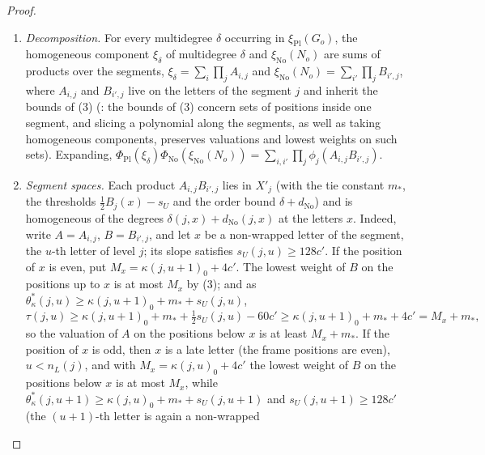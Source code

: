 \begin{proof}
\begin{enumerate}[label=(\arabic*)]
letter are at most $\kappa(j,u)_0+4c'$, resp.\ $\kappa(j,u+1)_0+4c'$; and the supports lie on the letters of the segments, with the normal parts off the wrapped letters and of degrees
$d_{\mathrm{No}}$ (). Indeed, these sets of positions are the images of
the chain sets ($u\le n_L(j)$) and of the link sets ($u=u_m$, $m+2\le r$) of $\mathcal D$, and the $Y$-space bounds give
$\theta(j,i)-s(j,i)-24c=\theta^*_\kappa-\frac18s_U-\frac38s_U-24c'\ge\tau$ on chains and $\theta_L(j,m)-60c=\theta^*_\kappa-\frac38s_U-60c'\ge\tau$ on
links (as $s_U\ge0$); the lowest weight bounds are those of the norm test.
\item \emph{Decomposition.} For every multidegree $\delta$ occurring in $\xi_{\mathrm{Pl}}(G_o)$, the homogeneous component
$\xi_\delta$ of multidegree $\delta$ and $\xi_{\mathrm{No}}(N_o)$ are sums of products over the segments,
$\xi_\delta=\sum_i\prod_jA_{i,j}$ and $\xi_{\mathrm{No}}(N_o)=\sum_{i'}\prod_jB_{i',j}$, where $A_{i,j}$ and $B_{i',j}$ live on the letters of the
segment $j$ and inherit the bounds of (3) (: the
bounds of (3) concern sets of positions inside one segment, and slicing a polynomial along the segments, as well as taking homogeneous
components, preserves valuations and lowest weights on such sets). Expanding,
$\Phi_{\mathrm{Pl}}(\xi_\delta)\Phi_{\mathrm{No}}(\xi_{\mathrm{No}}(N_o))=\sum_{i,i'}\prod_j\phi_j(A_{i,j}B_{i',j})$.
\item \emph{Segment spaces.} Each product $A_{i,j}B_{i',j}$ lies in $X'_j$ (with the tie constant $m_*$, the thresholds
$\frac12B_j(x)-s_U$ and the order bound $\delta+d_{\mathrm{No}}$) and is homogeneous of the degrees $\delta(j,x)+d_{\mathrm{No}}(j,x)$ at the
letters $x$. Indeed, write $A=A_{i,j}$, $B=B_{i',j}$, and let $x$ be a non-wrapped letter of the segment, the $u$-th letter of level
$j$; its slope satisfies $s_U(j,u)\ge128c'$. If the position of $x$ is even, put $M_x=\kappa(j,u+1)_0+4c'$. The lowest weight of $B$ on the
positions up to $x$ is at most $M_x$ by (3); and as $\theta^*_\kappa(j,u)\ge\kappa(j,u+1)_0+m_*+s_U(j,u)$,
\[
\tau(j,u)\ge\kappa(j,u+1)_0+m_*+\tfrac12s_U(j,u)-60c'\ge\kappa(j,u+1)_0+m_*+4c'=M_x+m_*,
\]
so the valuation of $A$ on the positions below $x$ is at least $M_x+m_*$. If the position of $x$ is odd, then $x$ is a late letter (the
frame positions are even), $u<n_L(j)$, and with $M_x=\kappa(j,u)_0+4c'$ the lowest weight of $B$ on the positions below $x$ is at most
$M_x$, while $\theta^*_\kappa(j,u+1)\ge\kappa(j,u)_0+m_*+s_U(j,u+1)$ and $s_U(j,u+1)\ge128c'$ (the $(u+1)$-th letter is again a non-wrapped

\end{enumerate}
\end{proof}
